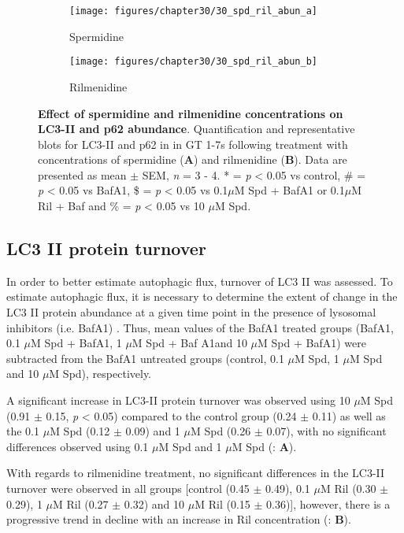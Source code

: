 {\begin{landscape}
\begin{figure}[!htbp]
  \centering
  \begin{subfigure}[b]{0.35\linewidth}
    \texttt{[image: figures/chapter30/30\_spd\_ril\_abun\_a]}
    \caption{Spermidine}
  \end{subfigure}
  \begin{subfigure}[b]{0.35\linewidth}
    \texttt{[image: figures/chapter30/30\_spd\_ril\_abun\_b]}
    \caption{Rilmenidine}
  \end{subfigure}
  \caption[Effect of spermidine and rilmenidine concentrations on LC3-II and p62 abundance]{\textbf{Effect of spermidine and rilmenidine concentrations on LC3-II and p62 abundance}. Quantification and representative blots for LC3-II and p62 in in GT 1-7s following treatment with concentrations of spermidine (\textbf{A}) and rilmenidine (\textbf{B}). Data are presented as mean $\pm$ SEM, \textit{n} = 3 - 4. * = \textit{p} < 0.05 vs control, \# = \textit{p} < 0.05 vs BafA1, \$ = \textit{p} < 0.05 vs 0.1$\mu$M Spd + BafA1 or 0.1$\mu$M Ril + Baf and \% = \textit{p} < 0.05 vs 10 $\mu$M Spd.}
  \label{fig:30_spd_ril_abun_a}
\end{figure}
\end{landscape}

\subsection{LC3 II protein turnover}
In order to better estimate autophagic flux, turnover of LC3 II was assessed. To estimate autophagic flux, it is necessary to determine the extent of change in the LC3 II protein abundance at a given time point in the presence of lysosomal inhibitors (i.e. BafA1) \citep{Martinez-Lopez2013}. Thus, mean values of the BafA1 treated groups (BafA1, 0.1 $\mu$M Spd + BafA1, 1 $\mu$M Spd + Baf A1and 10 $\mu$M Spd + BafA1) were subtracted from the BafA1 untreated groups (control, 0.1 $\mu$M Spd, 1 $\mu$M Spd and 10 $\mu$M Spd), respectively.

A significant increase in LC3-II protein turnover was observed using 10 $\mu$M Spd (0.91 $\pm$ 0.15, \textit{p} < 0.05) compared to the control group (0.24 $\pm$ 0.11) as well as the 0.1 $\mu$M Spd (0.12 $\pm$ 0.09) and 1 $\mu$M Spd (0.26 $\pm$ 0.07), with no significant differences observed using 0.1 $\mu$M Spd  and 1 $\mu$M Spd (: \textbf{A}). 

With regards to rilmenidine treatment, no significant differences in the LC3-II turnover were observed in all groups [control (0.45 $\pm$ 0.49), 0.1 $\mu$M Ril (0.30 $\pm$ 0.29), 1 $\mu$M Ril (0.27 $\pm$ 0.32) and 10 $\mu$M Ril (0.15 $\pm$ 0.36)], however, there is a progressive trend in decline with an increase in Ril concentration (: \textbf{B}). 

}
